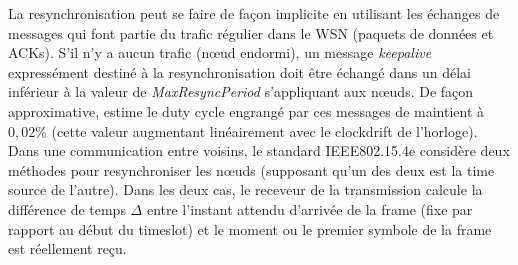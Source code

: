 \documentclass[]{report}
\begin{document}
\par La resynchronisation peut se faire de façon implicite en utilisant les échanges de messages qui font partie du trafic régulier dans le WSN (paquets de données et ACKs). S'il n'y a aucun trafic (nœud endormi), un message \textit{keepalive} expressément destiné à la resynchronisation doit être échangé dans un délai inférieur à la valeur de \textit{MaxResyncPeriod} s'appliquant aux nœuds. De façon approximative, \cite{openWSN} estime le duty cycle engrangé par ces messages de maintient à $0,02\%$ (cette valeur augmentant linéairement avec le clockdrift de l'horloge). Dans une communication entre voisins, le standard IEEE802.15.4e \cite{IEEE802.15.4} considère deux méthodes pour resynchroniser les nœuds (supposant qu'un des deux est la time source de l'autre). Dans les deux cas, le receveur de la transmission calcule la différence de temps $\Delta$ entre l'instant attendu d'arrivée de la frame (fixe par rapport au début du timeslot) et le moment ou le premier symbole de la frame est réellement reçu.

\vspace{0.2cm}
\end{document}
